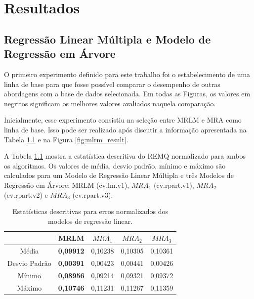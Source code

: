 \chapter{Resultados}\label{cap:results}

\section{Regressão Linear Múltipla e Modelo de Regressão em Árvore}

O primeiro experimento definido para este trabalho foi o estabelecimento de uma linha de base para que fosse possível comparar o desempenho de outras abordagens com a base de dados selecionada. Em todas as Figuras, os valores em negritos significam os melhores valores avaliados naquela comparação.

Inicialmente, esse experimento consistiu na seleção entre MRLM e MRA como linha de base. Isso pode ser realizado após discutir a informação apresentada na Tabela \ref{tab:lm_descriptive} e na Figura \ref{fig:mlrm_result}.

A Tabela \ref{tab:lm_descriptive} mostra a estatística descritiva do REMQ normalizado para ambos os algoritmos. Os valores de média, desvio padrão, mínimo e máximo são calculados para um Modelo de Regressão Linear Múltipla e três Modelos de Regressão em Árvore: MRLM (cv.lm.v1), $MRA_1$ (cv.rpart.v1), $MRA_2$ (cv.rpart.v2) e $MRA_3$ (cv.rpart.v3).

\begin{table}[h]
\caption{Estatísticas descritivas para erros normalizados dos modelos de regressão linear.}\label{tab:lm_descriptive} \centering
\begin{tabular}{|c|c|c|c|c|}
  \hline
   & MRLM & $MRA_1$ & $MRA_2$ & $MRA_3$ \\
  \hline
  Média & \textbf{0,09912} & 0,10238 & 0,10305 & 0,10361  \\
  \hline
  Desvio Padrão & \textbf{0,00391} & 0,00423 & 0,00441 & 0,00426  \\
  \hline
  Mínimo & \textbf{0,08956} & 0,09214 & 0,09321 & 0,09372  \\
  \hline
  Máximo & \textbf{0,10746} & 0,11231 & 0,11267 & 0,11359  \\
  \hline
\end{tabular}
\end{table}

